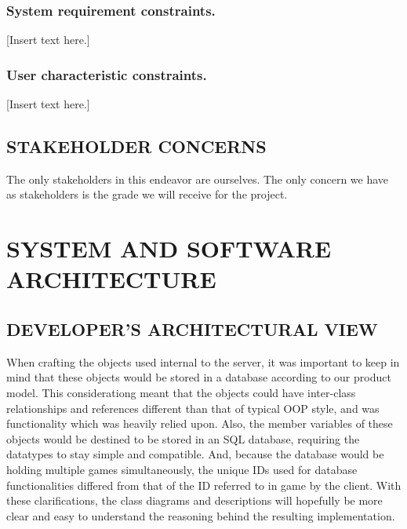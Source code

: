 \documentclass[twoside,letterpaper]{article}
\begin{document}
\subsubsection{System requirement constraints.}
{\color{black}
[Insert text here.]}

\subsubsection{User characteristic constraints.}
{\color{black}
[Insert text here.]}

\subsection[STAKEHOLDER
CONCERNS]{\bfseries\color{black} STAKEHOLDER
CONCERNS}

The only stakeholders in this endeavor are ourselves. The only concern we have as stakeholders is the grade we will receive for the project.

\bigskip


\clearpage\setcounter{page}{1}\pagestyle{Convertvi}
\section[SYSTEM AND SOFTWARE
ARCHITECTURE]{\bfseries\color{black} SYSTEM AND
SOFTWARE ARCHITECTURE}


\subsection[DEVELOPER{\textquoteright}S ARCHITECTURAL
VIEW]{\bfseries\color{black}
DEVELOPER{\textquoteright}S ARCHITECTURAL VIEW}
When crafting the objects used internal to the server, it was important to keep in mind that these objects would be stored in a database according to our product model. This considerationg meant that the objects could have inter-class relationships and references different than that of typical OOP style, and was functionality which was heavily relied upon. Also, the member variables of these objects would be destined to be stored in an SQL database, requiring the datatypes to stay simple and compatible. And, because the database would be holding multiple games simultaneously, the unique IDs used for database functionalities differed from that of the ID referred to in game by the client. With these clarifications, the class diagrams and descriptions will hopefully be more clear and easy to understand the reasoning behind the resulting implementation.
\end{document}
